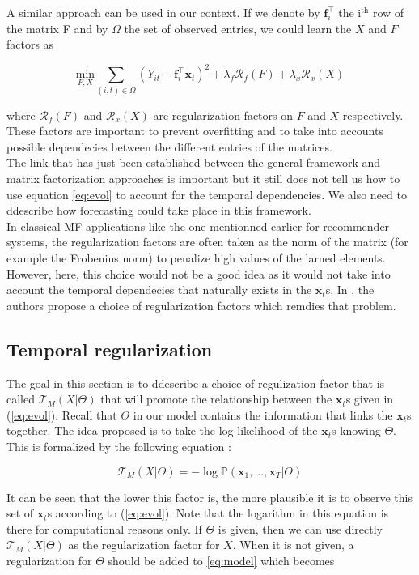 \documentclass{article}
\begin{document}
A similar approach can be used in our context. If we denote by $\mathbf{f}_i^\top$ the i$^\text{th}$ row of the matrix F and by $\Omega$ the set of observed entries, we could learn the $X$ and $F$ factors as

\begin{equation}
\underset{F,X}{\text{min}} \sum_{(i,t) \in \Omega} (Y_{it} - \mathbf{f}_i^\top\mathbf{x}_t)^2 + \lambda_f \mathcal{R}_f(F) + \lambda_x \mathcal{R}_x(X)
\label{eq:model}
\end{equation}

where $\mathcal{R}_f(F)$ and $\mathcal{R}_x(X)$ are regularization factors on $F$ and $X$ respectively. These factors are important to prevent overfitting and to take into accounts possible dependecies between the different entries of the matrices. \\
The link that has just been established between the general framework and matrix factorization approaches is important but it still does not tell us how to use equation \ref{eq:evol} to account for the temporal dependencies. We also need to ddescribe how forecasting could take place in this framework. \\
In classical MF applications like the one mentionned earlier for recommender systems, the regularization factors are often taken as the norm of the matrix (for example the Frobenius norm) to penalize high values of the larned elements. However, here, this choice would not be a good idea as it would not take into account the temporal dependecies that naturally exists in the $\mathbf{x}_t$s. In \cite{TRMF}, the authors propose a choice of regularization factors which remdies that problem.

\subsection*{Temporal regularization}

The goal in this section is to ddescribe a choice of regulization factor that is called $\mathcal{T}_M(X | \Theta)$ that will promote the relationship between the $\mathbf{x}_t$s given in (\ref{eq:evol}).
Recall that $\Theta$ in our model contains the information that links the $\mathbf{x}_t$s together. The idea proposed is to take the log-likelihood of the $\mathbf{x}_t$s knowing $\Theta$. This is formalized by the following equation :

$$\mathcal{T}_M(X | \Theta) = -\log{\mathbb{P}(\mathbf{x}_1, ..., \mathbf{x}_T|\Theta)}$$

It can be seen that the lower this factor is, the more plausible it is to observe this set of $\mathbf{x}_t$s according to (\ref{eq:evol}). Note that the logarithm in this equation is there for computational reasons only. If $\Theta$ is given, then we can use directly $\mathcal{T}_M(X | \Theta)$ as the regularization factor for $X$. When it is not given, a regularization for $\Theta$ should be added to \ref{eq:model} which becomes
\end{document}
